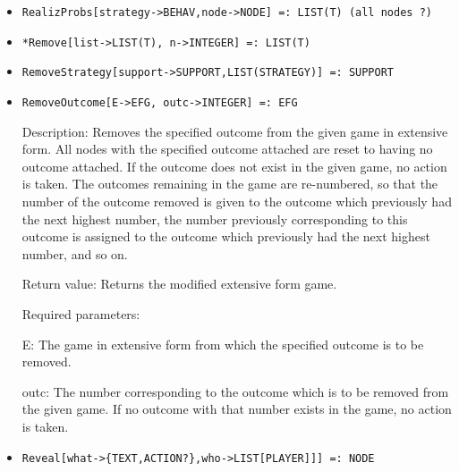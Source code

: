 \begin{itemize}
\item
\protect \large \begin{verbatim}
RealizProbs[strategy->BEHAV,node->NODE] =: LIST(T) (all nodes ?)
\end{verbatim}\normalsize

\item
\protect \large \begin{verbatim}
*Remove[list->LIST(T), n->INTEGER] =: LIST(T)
\end{verbatim}\normalsize

\item
\protect \large \begin{verbatim}
RemoveStrategy[support->SUPPORT,LIST(STRATEGY)] =: SUPPORT
\end{verbatim}\normalsize

\item

\protect \large \begin{verbatim}
RemoveOutcome[E->EFG, outc->INTEGER] =: EFG
\end{verbatim}\normalsize

\bd
\item
[Description:] Removes the specified outcome from the given game in
extensive form.  All nodes with the specified outcome attached are
reset to having no outcome attached.  If the outcome does not exist in
the given game, no action is taken.  The outcomes remaining in the
game are re-numbered, so that the number of the outcome removed is
given to the outcome which previously had the next highest number, the
number previously corresponding to this outcome is assigned to the
outcome which previously had the next highest number, and so on.
\item  
[Return value:] Returns the modified extensive form game.
\item
[Required parameters:]\hfil\null
	
\bd
\item
[E:] The game in extensive form from which the specified outcome is
to be removed.
\item
[outc:] The number corresponding to the outcome which is to be removed
from the given game.  If no outcome with that number exists in the
game, no action is taken.
\ed
\ed

\item
\protect \large \begin{verbatim}
Reveal[what->{TEXT,ACTION?},who->LIST[PLAYER]]] =: NODE     
\end{verbatim}\normalsize



\end{itemize}
